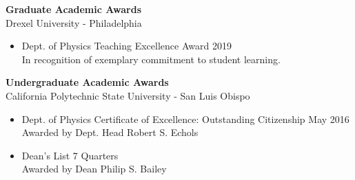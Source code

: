 \documentclass[10pt]{article}
\newenvironment{innerlist}[1][\enskip\textbullet]%
        {\begin{itemize}[#1,leftmargin=*,parsep=0pt,itemsep=0pt,topsep=0pt,partopsep=0pt]}
        {\end{itemize}}
\newcommand{\halfblankline}{\quad\vspace{-0.5\baselineskip}\pagebreak[3]}
\begin{document}







\iflong
\textbf{Graduate Academic Awards}\\
Drexel University - Philadelphia
\begin{innerlist}
\item Dept. of Physics Teaching Excellence Award \hfill 2019\\
In recognition of exemplary commitment to student learning.
\end{innerlist}
\fi
\halfblankline

\iflong
\textbf{Undergraduate Academic Awards}\\
California Polytechnic State University - San Luis Obispo
\begin{innerlist}
\item Dept. of Physics Certificate of Excellence: Outstanding Citizenship \hfill May 2016\\
Awarded by Dept. Head Robert S. Echols
\item Dean's List \hfill 7 Quarters\\
Awarded by Dean Philip S. Bailey
\end{innerlist}
\fi
\end{document}
